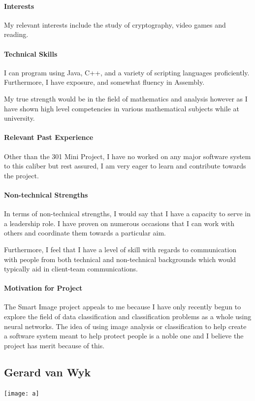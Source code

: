\documentclass[12pt]{article}
\begin{document}
\paragraph{Interests}
My relevant interests include the study of cryptography, video games and reading.
\paragraph{Technical Skills}
I can program using Java, C++, and a variety of scripting languages proficiently.
Furthermore, I have exposure, and somewhat fluency in Assembly.

My true strength would be in the field of mathematics and analysis however as I have shown high level competencies in various mathematical subjects while at university.
\paragraph{Relevant Past Experience}
Other than the 301 Mini Project, I have no worked on any major software system to this caliber but rest assured, I am very eager to learn and contribute towards the project.
\paragraph{Non-technical Strengths}
In terms of non-technical strengths, I would say that I have a capacity to serve in a leadership role. I have proven on numerous occasions that I can work with others and coordinate them towards a particular aim.

Furthermore, I feel that I have a level of skill with regards to communication with people from both technical and non-technical backgrounds which would typically aid in client-team communications.
\paragraph{Motivation for Project}
The Smart Image project appeals to me because I have only recently begun to explore the field of data classification and classification problems as a whole using neural networks. The idea of using image analysis or classification to help create a software system meant to help protect people is a noble one and I believe the project has merit because of this.

\subsection{Gerard van Wyk}
\texttt{[image: a]}
\end{document}
